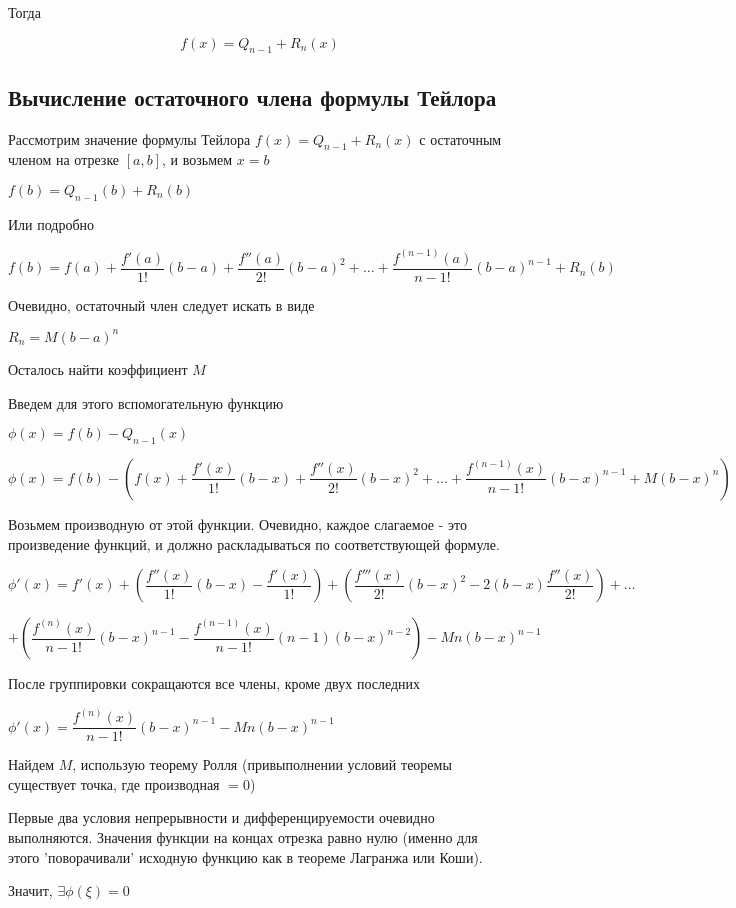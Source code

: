 Тогда

$$
f(x) = Q_{n-1} + R_n(x)
$$

\subsection{Вычисление остаточного члена формулы Тейлора}

Рассмотрим значение формулы Тейлора $ f(x) = Q_{n-1} + R_n(x) $ с остаточным членом на отрезке $ [a,b] $,
и возьмем $ x = b $

$ f(b) = Q_{n-1}(b) + R_n(b) $

Или подробно

$ f(b) = 
f(a) + \dfrac{f'(a)}{1!}(b-a) 
+ \dfrac{f''(a)}{2!}(b-a)^{2} 
+ \ldots 
+ \dfrac{f^{(n-1)}(a)}{n-1!}(b-a)^{n-1} + R_n(b) $

Очевидно, остаточный член следует искать в виде

$ R_n = M(b-a)^{n} $

Осталось найти коэффициент $ M $

Введем для этого вспомогательную функцию

$ \phi(x) = f(b) - Q_{n-1}(x) $

$ \phi(x) = f(b) - \left(  f(x) + \dfrac{f'(x)}{1!}(b-x)
+ \dfrac{f''(x)}{2!}(b-x)^{2} 
+ \ldots 
+ \dfrac{f^{(n-1)}(x)}{n-1!}(b-x)^{n-1} + M (b-x)^{n}\right)  $

Возьмем производную от этой функции. Очевидно, каждое слагаемое - это произведение функций, и должно раскладываться по соответствующей формуле.

$ \phi'(x) = 
f'(x)
+ \left( \dfrac{f''(x)}{1!}(b-x) - \dfrac{f'(x)}{1!} \right) 
+ \left(  \dfrac{f'''(x)}{2!}(b-x)^{2} - 2(b-x)\dfrac{f''(x)}{2!} \right) 
+ \ldots$

$+ \left(  \dfrac{f^{(n)}(x)}{n-1!}(b-x)^{n-1} -  \dfrac{f^{(n-1)}(x)}{n-1!}(n-1)(b-x)^{n-2} \right)
- M n(b-x)^{n-1}$

После группировки сокращаются все члены, кроме двух последних

$ \phi'(x) = \dfrac{f^{(n)}(x)}{n-1!}(b-x)^{n-1} - M n(b-x)^{n-1} $

Найдем $ M $, использую теорему Ролля (привыполнении условий теоремы существует точка, где производная $ = 0 $)

Первые два условия непрерывности и дифференцируемости очевидно выполняются.
Значения функции на концах отрезка равно нулю (именно для этого 'поворачивали' исходную функцию как в теореме Лагранжа или Коши).

Значит, $ \exists \phi(\xi) = 0 $

